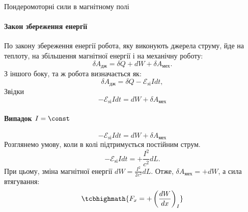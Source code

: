 \documentclass[onlytextwidth]{beamer}
\begin{document}
\begin{frame}{Пондеромоторні сили в магнітному полі}{}
	\framesubtitle<1>{Закон збереження енергії}
	\begin{center}
		\begin{pict}
		\end{pict}
	\end{center}
	\begin{overprint}
		\begin{block}{}\justifying
			По \alert{закону збереження енергії} \alert{робота, яку виконують джерела струму}, йде на теплоту, на збільшення магнітної енергії і на
			механічну роботу:
			\begin{equation*}
				\delta A_\text{дж} = \delta Q + dW + \delta A_\text{мех}.
			\end{equation*}
			З іншого боку, та ж робота визначається як:
			\begin{equation*}
				\delta A_\text{дж} = \delta Q - \mathcal{E}_\text{si} I dt,
			\end{equation*}
			Звідки
			\begin{equation*}
				- \mathcal{E}_\text{si} I dt = dW + \delta A_\text{мех}
			\end{equation*}
		\end{block}
		\framesubtitle<2>{Випадок $I = \const$}
		\begin{equation*}
			-\mathcal{E}_\text{si} I dt = dW + \delta A_\text{мех}
		\end{equation*}
		Розглянемо умову, коли в колі підтримується постійним струм.
		\begin{equation*}
			- \mathcal{E}_\text{si} I dt = + \frac{I^2}{c^2} dL.
		\end{equation*}
		При цьому, зміна магнітної енергії $dW = \frac{I^2}{2c^2} dL$. Отже, $\delta A_\text{мех} = + dW$, а сила втягування:
		\begin{equation*}
			\tcbhighmath{F_x = + \left( \frac{d W}{dx} \right)_{I}}

\end{equation*}
\end{overprint}
\end{frame}
\end{document}
